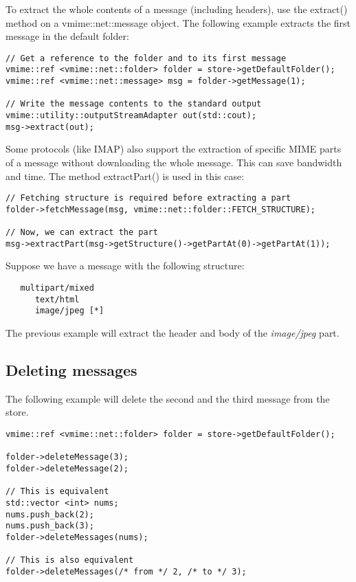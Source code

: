 To extract the whole contents of a message (including headers), use the
{\vcode extract()} method on a {\vcode vmime::net::message} object. The
following example extracts the first message in the default folder:

\begin{lstlisting}[caption={Extracting messages}]
// Get a reference to the folder and to its first message
vmime::ref <vmime::net::folder> folder = store->getDefaultFolder();
vmime::ref <vmime::net::message> msg = folder->getMessage(1);

// Write the message contents to the standard output
vmime::utility::outputStreamAdapter out(std::cout);
msg->extract(out);
\end{lstlisting}

Some protocols (like IMAP) also support the extraction of specific MIME parts
of a message without downloading the whole message. This can save bandwidth
and time. The method {\vcode extractPart()} is used in this case:

\begin{lstlisting}[caption={Extracting a specific MIME part of a message}]
// Fetching structure is required before extracting a part
folder->fetchMessage(msg, vmime::net::folder::FETCH_STRUCTURE);

// Now, we can extract the part
msg->extractPart(msg->getStructure()->getPartAt(0)->getPartAt(1));
\end{lstlisting}

Suppose we have a message with the following structure:

\begin{verbatim}
   multipart/mixed
      text/html
      image/jpeg [*]
\end{verbatim}

The previous example will extract the header and body of the \emph{image/jpeg}
part.

\subsection{Deleting messages} %

The following example will delete the second and the third message from the
store.

\begin{lstlisting}[caption={Deleting messages}]
vmime::ref <vmime::net::folder> folder = store->getDefaultFolder();

folder->deleteMessage(3);
folder->deleteMessage(2);

// This is equivalent
std::vector <int> nums;
nums.push_back(2);
nums.push_back(3);
folder->deleteMessages(nums);

// This is also equivalent
folder->deleteMessages(/* from */ 2, /* to */ 3);
\end{lstlisting}

